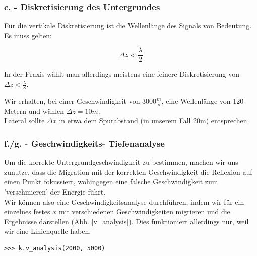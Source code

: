 \documentclass[12pt,a4paper]{scrartcl}
\begin{document}
\subsubsection*{c. - Diskretisierung des Untergrundes}

Für die vertikale Diskretisierung ist die Wellenlänge des Signals von Bedeutung.
Es muss gelten:

\begin{equation}
	\Delta z < \frac{\lambda}{2}
\end{equation}

In der Praxis wählt man allerdings meistens eine feinere Diskretisierung von $\Delta z < \frac{\lambda}{8}$.

Wir erhalten, bei einer Geschwindigkeit von $3000 \frac{m}{s}$, eine Wellenlänge von 120 Metern und wählen $\Delta z = 10m$.\\

Lateral sollte $\Delta x$ in etwa dem Spurabstand (in unserem Fall 20m) entsprechen.\\

\subsubsection*{f./g. - Geschwindigkeits- Tiefenanalyse}

Um die korrekte Untergrundgeschwindigkeit zu bestimmen, machen wir uns zunutze, dass die Migration mit der korrekten Geschwindigkeit die Reflexion auf einen Punkt fokussiert, wohingegen eine falsche Geschwindigkeit zum 'verschmieren' der Energie führt.\\

Wir können also eine Geschwindigkeitsanalyse durchführen, indem wir für ein einzelnes festes $x$  mit verschiedenen Geschwindigkeiten migrieren und die Ergebnisse darstellen (Abb. \ref{v_analysis}). Dies funktioniert allerdings nur, weil wir eine Linienquelle haben.

\begin{verbatim}
>>> k.v_analysis(2000, 5000)
\end{verbatim}
\end{document}
